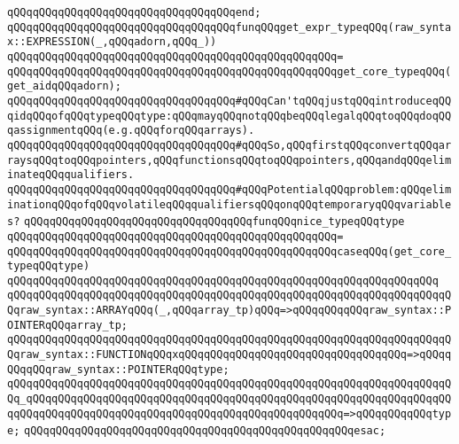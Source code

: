 \verb|qQQqqQQqqQQqqQQqqQQqqQQqqQQqqQQqqQQqend;|\newline
\newline
\verb|qQQqqQQqqQQqqQQqqQQqqQQqqQQqqQQqqQQqfunqQQqget_expr_typeqQQq(raw_syntax::EXPRESSION(_,qQQqadorn,qQQq_))|\newline
\verb|qQQqqQQqqQQqqQQqqQQqqQQqqQQqqQQqqQQqqQQqqQQqqQQqqQQq=|\newline
\verb|qQQqqQQqqQQqqQQqqQQqqQQqqQQqqQQqqQQqqQQqqQQqqQQqqQQqget_core_typeqQQq(get_aidqQQqadorn);|\newline
\newline
\verb|qQQqqQQqqQQqqQQqqQQqqQQqqQQqqQQqqQQq#qQQqCan'tqQQqjustqQQqintroduceqQQqidqQQqofqQQqtypeqQQqtype:qQQqmayqQQqnotqQQqbeqQQqlegalqQQqtoqQQqdoqQQqassignmentqQQq(e.g.qQQqforqQQqarrays).|\newline
\verb|qQQqqQQqqQQqqQQqqQQqqQQqqQQqqQQqqQQq#qQQqSo,qQQqfirstqQQqconvertqQQqarraysqQQqtoqQQqpointers,qQQqfunctionsqQQqtoqQQqpointers,qQQqandqQQqeliminateqQQqqualifiers.|\newline
\verb|qQQqqQQqqQQqqQQqqQQqqQQqqQQqqQQqqQQq#qQQqPotentialqQQqproblem:qQQqeliminationqQQqofqQQqvolatileqQQqqualifiersqQQqonqQQqtemporaryqQQqvariables?|\newline
\newline
\verb|qQQqqQQqqQQqqQQqqQQqqQQqqQQqqQQqqQQqfunqQQqnice_typeqQQqtype|\newline
\verb|qQQqqQQqqQQqqQQqqQQqqQQqqQQqqQQqqQQqqQQqqQQqqQQqqQQq=|\newline
\verb|qQQqqQQqqQQqqQQqqQQqqQQqqQQqqQQqqQQqqQQqqQQqqQQqqQQqcaseqQQq(get_core_typeqQQqtype)|\newline
\verb|qQQqqQQqqQQqqQQqqQQqqQQqqQQqqQQqqQQqqQQqqQQqqQQqqQQqqQQqqQQqqQQqqQQq|\newline
\verb|qQQqqQQqqQQqqQQqqQQqqQQqqQQqqQQqqQQqqQQqqQQqqQQqqQQqqQQqqQQqqQQqqQQqqQQqraw_syntax::ARRAYqQQq(_,qQQqarray_tp)qQQq=>qQQqqQQqqQQqraw_syntax::POINTERqQQqarray_tp;|\newline
\verb|qQQqqQQqqQQqqQQqqQQqqQQqqQQqqQQqqQQqqQQqqQQqqQQqqQQqqQQqqQQqqQQqqQQqqQQqraw_syntax::FUNCTIONqQQqxqQQqqQQqqQQqqQQqqQQqqQQqqQQqqQQqqQQq=>qQQqqQQqqQQqraw_syntax::POINTERqQQqtype;|\newline
\verb|qQQqqQQqqQQqqQQqqQQqqQQqqQQqqQQqqQQqqQQqqQQqqQQqqQQqqQQqqQQqqQQqqQQqqQQq_qQQqqQQqqQQqqQQqqQQqqQQqqQQqqQQqqQQqqQQqqQQqqQQqqQQqqQQqqQQqqQQqqQQqqQQqqQQqqQQqqQQqqQQqqQQqqQQqqQQqqQQqqQQqqQQqqQQqqQQq=>qQQqqQQqqQQqtype;|\newline
\verb|qQQqqQQqqQQqqQQqqQQqqQQqqQQqqQQqqQQqqQQqqQQqqQQqqQQqesac;|\newline
